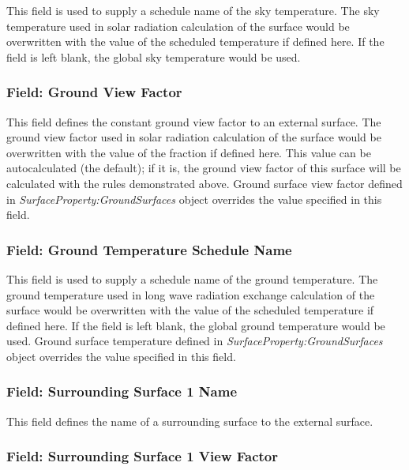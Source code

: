 This field is used to supply a schedule name of the sky temperature. The sky temperature used in solar radiation calculation of the surface would be overwritten with the value of the scheduled temperature if defined here. If the field is left blank, the global sky temperature would be used.

\subsubsection{Field: Ground View Factor}\label{field-ground-view-factor}

This field defines the constant ground view factor to an external surface. The ground view factor used in solar radiation calculation of the surface would be overwritten with the value of the fraction if defined here. This value can be autocalculated (the default); if it is, the ground view factor of this surface will be calculated with the rules demonstrated above. Ground surface view factor defined in \textit{SurfaceProperty:GroundSurfaces} object overrides the value specified in this field.

\subsubsection{Field: Ground Temperature Schedule Name}\label{field-ground-temperature-schedule-name}

This field is used to supply a schedule name of the ground temperature. The ground temperature used in long wave radiation exchange calculation of the surface would be overwritten with the value of the scheduled temperature if defined here. If the field is left blank, the global ground temperature would be used. Ground surface temperature defined in \textit{SurfaceProperty:GroundSurfaces} object overrides the value specified in this field.

\subsubsection{Field: Surrounding Surface 1 Name}\label{field-surrounding-surface-1-name}

This field defines the name of a surrounding surface to the external surface.

\subsubsection{Field: Surrounding Surface 1 View Factor}\label{field-surrounding-surface-1-view-factor}

